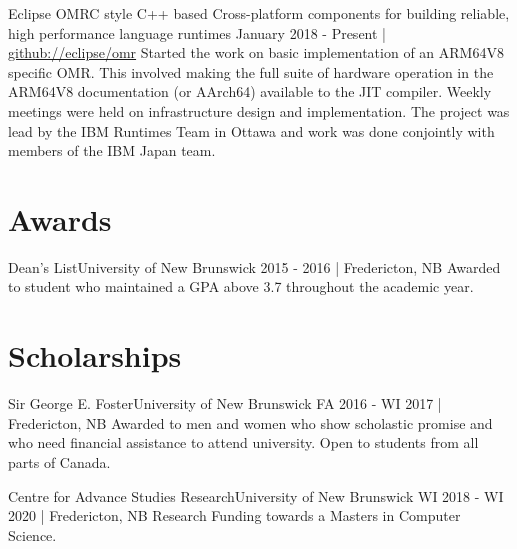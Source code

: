 \documentclass[english]{deedy-resume-openfont}
\begin{document}
    \employement%
        {Eclipse OMR}{C style C++ based Cross-platform components for building reliable, high performance language runtimes}
        {January 2018 - Present | \href{https://github.com/eclipse/omr}{github://eclipse/omr}}{%
        Started the work on basic implementation of an ARM64V8 specific OMR. 
        This involved making the full suite of hardware operation in the ARM64V8 documentation (or AArch64) available to the JIT compiler. 
        Weekly meetings were held on infrastructure design and implementation. 
        The project was lead by the IBM Runtimes Team in Ottawa and work was done conjointly with members of the IBM Japan team.
        }

\section{Awards}

    \employement%
        {Dean's List}{University of New Brunswick}
        {2015 - 2016 | Fredericton, NB}{%
        Awarded to student who maintained a GPA above 3.7 throughout the academic year.
        }

\section{Scholarships}

    \employement%
        {Sir George E. Foster}{University of New Brunswick}
        {FA 2016 - WI 2017  | Fredericton, NB}{%
        Awarded to men and women who show scholastic promise and who need financial assistance to attend university. 
        Open to students from all parts of Canada.
        }

    \employement%
        {Centre for Advance Studies Research}{University of New Brunswick}
        {WI 2018 - WI 2020   | Fredericton, NB}{%
        Research Funding towards a Masters in Computer Science.
        }





\end{document}
